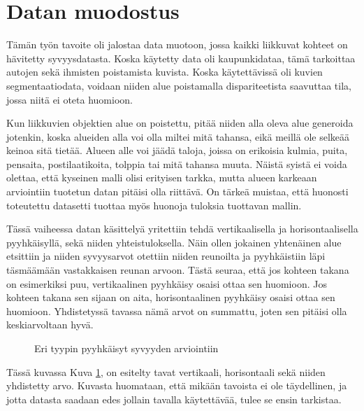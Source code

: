 \section{Datan muodostus}

Tämän työn tavoite oli jalostaa data muotoon, jossa kaikki liikkuvat kohteet on hävitetty syvyysdatasta.
Koska käytetty data oli kaupunkidataa, tämä tarkoittaa autojen sekä ihmisten poistamista kuvista.
Koska käytettävissä oli kuvien segmentaatiodata, voidaan niiden alue poistamalla dispariteetista saavuttaa tila, jossa niitä ei oteta huomioon.

Kun liikkuvien objektien alue on poistettu, pitää niiden alla oleva alue generoida jotenkin,
koska alueiden alla voi olla miltei mitä tahansa,
eikä meillä ole selkeää keinoa sitä tietää. 
Alueen alle voi jäädä taloja, joissa on erikoisia kulmia, puita, pensaita, postilaatikoita, tolppia tai mitä tahansa muuta. 
Näistä syistä ei voida olettaa, että kyseinen malli olisi erityisen tarkka, 
mutta alueen karkeaan arviointiin tuotetun datan pitäisi olla riittävä.
On tärkeä muistaa, että huonosti toteutettu datasetti tuottaa myös huonoja tuloksia tuottavan mallin.

Tässä vaiheessa datan käsittelyä yritettiin tehdä vertikaalisella ja horisontaalisella pyyhkäisyllä, sekä niiden yhteistuloksella.
Näin ollen jokainen yhtenäinen alue etsittiin ja niiden syvyysarvot otettiin niiden reunoilta
ja pyyhkäistiin läpi täsmäämään vastakkaisen reunan arvoon.
Tästä seuraa, että jos kohteen takana on esimerkiksi puu, vertikaalinen pyyhkäisy osaisi ottaa sen huomioon.
Jos kohteen takana sen sijaan on aita, horisontaalinen pyyhkäisy osaisi ottaa sen huomioon.
Yhdistetyssä tavassa nämä arvot on summattu, joten sen pitäisi olla keskiarvoltaan hyvä. 

\begin{figure}[h]
    \centering
    \caption{Eri tyypin pyyhkäisyt syvyyden arviointiin}
    \label{fig:swipe}
\end{figure}

Tässä kuvassa Kuva \ref{fig:swipe}, on esitelty tavat vertikaali, horisontaali sekä niiden yhdistetty arvo. 
Kuvasta huomataan, että mikään tavoista ei ole täydellinen,
ja jotta datasta saadaan edes jollain tavalla käytettävää, tulee se ensin tarkistaa. 

